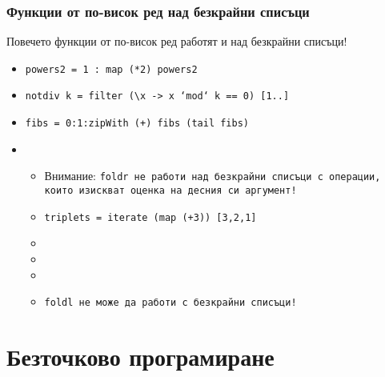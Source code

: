\documentclass{beamer}
\begin{document}
\begin{frame}
  \frametitle{Функции от по-висок ред над безкрайни списъци}
  Повечето функции от по-висок ред работят и над безкрайни списъци!
  \begin{itemize}[<+->]
  \item \tt{powers2 = 1 : map (*2) powers2}
  \item \tt{notdiv k = filter (\textbackslash x -> x `mod` k == 0) [1..]}
  \item \tt{fibs = 0:1:zipWith (+) fibs (tail fibs)}
  \item {}
    \begin{itemize}
    \item \alert{Внимание:} \tt{foldr} не работи над безкрайни списъци с операции, които изискват оценка на десния си аргумент!
    \item \tt{triplets = iterate (map (+3)) [3,2,1]}
    \item {}
    \item {}
    \item {}
    \item \alert{\tt{foldl} не може да работи с безкрайни списъци!}
    \end{itemize}
  \end{itemize}
\end{frame}

\section{Безточково програмиране}
\end{document}
